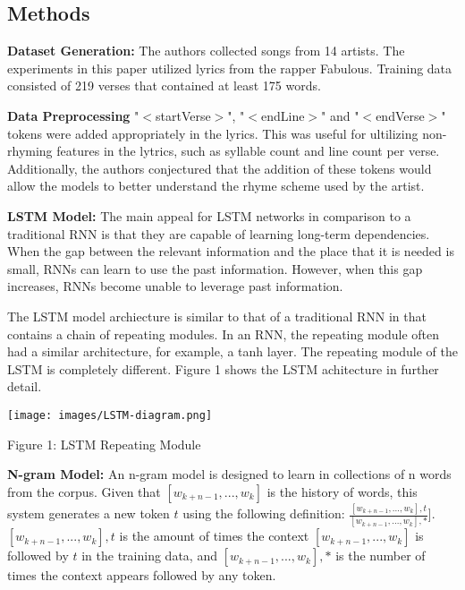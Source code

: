\documentclass{article}
\begin{document}
\begin{item}
\section{Methods}
\item \textbf{Dataset Generation:} The authors collected songs from 14 artists. The experiments in this paper utilized lyrics from the rapper Fabulous. Training data consisted of 219 verses that contained at least 175 words. 

\item \textbf{Data Preprocessing} "$<$startVerse$>$", "$<$endLine$>$" and "$<$endVerse$>$" tokens were added appropriately in the lyrics. This was useful for ultilizing non-rhyming features in the lytrics, such as syllable count and line count per verse. Additionally, the authors conjectured that the addition of these tokens would allow the models to better understand the rhyme scheme used by the artist. 

\item \textbf{LSTM Model:} 
The main appeal for LSTM networks in comparison to a traditional RNN is that they are capable of learning long-term dependencies. When the gap between the relevant information and the place that it is needed is small, RNNs can learn to use the past information. However, when this gap increases, RNNs become unable to leverage past information. 

The LSTM model archiecture is similar to that of a traditional RNN in that contains a chain of repeating modules. In an RNN, the repeating module often had a similar architecture, for example, a tanh layer. The repeating module of the LSTM is completely different. Figure 1 shows the LSTM achitecture in further detail.

\texttt{[image: images/LSTM-diagram.png]}

\centering \caption{Figure 1: LSTM Repeating Module}

\item \textbf{N-gram Model:}  
An n-gram model is designed to learn in collections of n words from the corpus. Given that $[w_{k+n-1},..., w_{k}]$ is the history of words, this system generates a new token $t$ using the following definition:
$\frac{[w_{k+n-1},..., w_{k}], t}{[w_{k+n-1},..., w_{k}], *}$]. $[w_{k+n-1},..., w_{k}], t$ is the amount of times the context $[w_{k+n-1},..., w_{k}]$ is followed by $t$ in the training data, and $[w_{k+n-1},..., w_{k}], *$ is the number of times the context appears followed by any token. 

\end{item}
\end{document}
